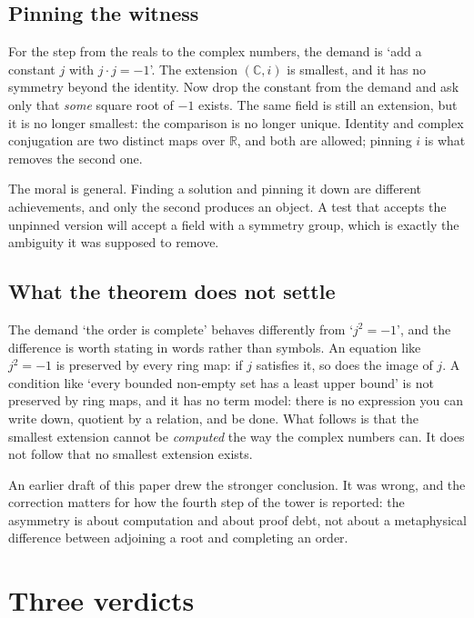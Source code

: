 \documentclass[12pt,a4paper]{article}
\begin{document}
\subsection{Pinning the witness}

For the step from the reals to the complex numbers, the demand is `add a constant
$j$ with $j\cdot j=-1$'.  The extension $(\mathbb{C},i)$ is smallest, and it has
no symmetry beyond the identity.  Now drop the constant from the demand and ask
only that \emph{some} square root of $-1$ exists.  The same field is still an
extension, but it is no longer smallest: the comparison is no longer unique.
Identity and complex conjugation are two distinct maps over $\mathbb{R}$, and both
are allowed; pinning $i$ is what removes the second one.

The moral is general.  Finding a solution and pinning it down are different
achievements, and only the second produces an object.  A test that accepts the
unpinned version will accept a field with a symmetry group, which is exactly the
ambiguity it was supposed to remove.

\subsection{What the theorem does not settle}

The demand `the order is complete' behaves differently from `$j^{2}=-1$', and the
difference is worth stating in words rather than symbols.  An equation like
$j^{2}=-1$ is preserved by every ring map: if $j$ satisfies it, so does the image
of $j$.  A condition like `every bounded non-empty set has a least upper bound' is
not preserved by ring maps, and it has no term model: there is no expression you
can write down, quotient by a relation, and be done.  What follows is that the
smallest extension cannot be \emph{computed} the way the complex numbers can.  It
does not follow that no smallest extension exists.

An earlier draft of this paper drew the stronger conclusion.  It was wrong, and
the correction matters for how the fourth step of the tower is reported: the
asymmetry is about computation and about proof debt, not about a metaphysical
difference between adjoining a root and completing an order.

\section{Three verdicts}
\label{sec:verdicts}
\end{document}
